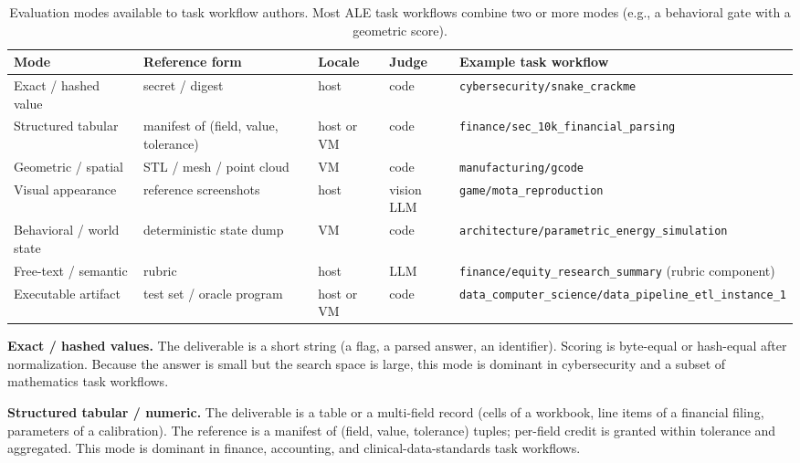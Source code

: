 \documentclass{llmxive}
\begin{document}
\begin{table}[htbp]
    \centering
    \footnotesize
    \setlength{\tabcolsep}{4pt}
    \begin{tabular}{>{\arraybackslash}p{2.4cm} >{\arraybackslash}p{3.0cm} >{\arraybackslash}p{1.6cm} >{\arraybackslash}p{1.6cm} >{\arraybackslash}p{4.0cm}}
        \toprule
        \textbf{Mode} & \textbf{Reference form} & \textbf{Locale} & \textbf{Judge} & \textbf{Example task workflow}\\
        \midrule
        Exact / hashed value & secret / digest & host & code & \texttt{cybersecurity/}\allowbreak\texttt{snake\_crackme}\\
        Structured tabular & manifest of (field, value, tolerance) & host or VM & code & \texttt{finance/}\allowbreak\texttt{sec\_10k\_}\allowbreak\texttt{financial\_parsing}\\
        Geometric / spatial & STL / mesh / point cloud & VM & code & \texttt{manufacturing/}\allowbreak\texttt{gcode}\\
        Visual appearance & reference screenshots & host & vision LLM & \texttt{game/}\allowbreak\texttt{mota\_reproduction}\\
        Behavioral / world state & deterministic state dump & VM & code & \texttt{architecture/}\allowbreak\texttt{parametric\_}\allowbreak\texttt{energy\_simulation}\\
        Free-text / semantic & rubric & host & LLM & \texttt{finance/}\allowbreak\texttt{equity\_research\_}\allowbreak\texttt{summary} (rubric component)\\
        Executable artifact & test set / oracle program & host or VM & code & \texttt{data\_computer\_}\allowbreak\texttt{science/}\allowbreak\texttt{data\_pipeline\_}\allowbreak\texttt{etl\_instance\_1}\\
        \bottomrule
    \end{tabular}
    \caption{Evaluation modes available to task workflow authors. Most ALE task workflows combine two or more modes (e.g., a behavioral gate with a geometric score).}
    \label{tab:eval-modes}
\end{table}

\noindent \textbf{Exact / hashed values.} The deliverable is a short string (a flag, a parsed answer, an identifier). Scoring is byte-equal or hash-equal after normalization. Because the answer is small but the search space is large, this mode is dominant in cybersecurity and a subset of mathematics task workflows.

\noindent \textbf{Structured tabular / numeric.} The deliverable is a table or a multi-field record (cells of a workbook, line items of a financial filing, parameters of a calibration). The reference is a manifest of (field, value, tolerance) tuples; per-field credit is granted within tolerance and aggregated. This mode is dominant in finance, accounting, and clinical-data-standards task workflows.
\end{document}
